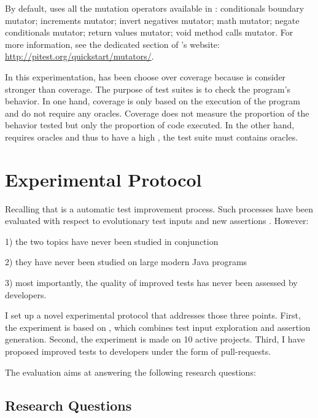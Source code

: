 By default, \dspot uses all the mutation operators available in \pitest: 
conditionals boundary mutator;
increments mutator;
invert negatives mutator;
math mutator;
negate conditionals mutator;
return values mutator;
void method calls mutator.
For more information, see the dedicated section of \pitest's website: \url{http://pitest.org/quickstart/mutators/}.

In this experimentation, \ms has been choose over coverage because \ms is consider stronger than coverage.
The purpose of test suites is to check the program's behavior.
In one hand, coverage is only based on the execution of the program and do not require any oracles.
Coverage does not measure the proportion of the behavior tested but only the proportion of code executed.
In the other hand, \ms requires oracles and thus to have a high \ms, the test suite must contains oracles.

\section{Experimental  Protocol}
\label{sec:test-improvement:experiment-protocol}

Recalling that \dspot is a automatic test improvement process.
Such processes have been evaluated with respect to evolutionary test inputs \cite{tonella} and new assertions \cite{Xie2006}.
However:

1) the two topics have never been studied in conjunction

2) they have never been studied on large modern Java programs

3) most importantly, the quality of improved tests has never been assessed by developers.

I set up a novel experimental protocol that addresses those three points.
First, the experiment is based on \dspot, which combines test input exploration and assertion generation.
Second, the experiment is made on 10 active \gh projects.
Third, I have proposed improved tests to developers under the form of pull-requests.

The evaluation aims at answering the following research questions:

\newcommand\rqpullrequest{RQ1\xspace}
\newcommand\rqcandidates{RQ2\xspace}
\newcommand\rqeffectiveness{RQ3\xspace}
\newcommand\rqAmplVersusIAmpl{RQ4\xspace}

\subsection{Research Questions}
\label{subsec:test-improvement:experiment-protocol:research questions}


